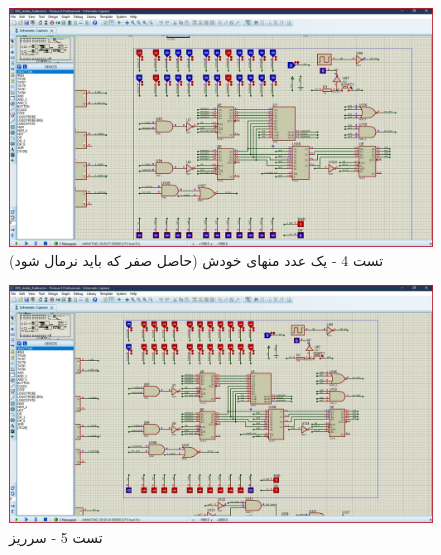 \documentclass[fleqn]{article}
\begin{document}
\begin{figure}[!htbp]
    \includegraphics[width=\textwidth]{Assets/test4.jpg}
    \caption{تست 4 - یک عدد منهای خودش (حاصل صفر که باید نرمال شود)}
    \label{t4}
\end{figure}

\begin{figure}[!htbp]
    \includegraphics[width=\textwidth]{Assets/test5.jpg}
    \caption{تست 5 - سرریز}
    \label{t5}
\end{figure}
\end{document}
